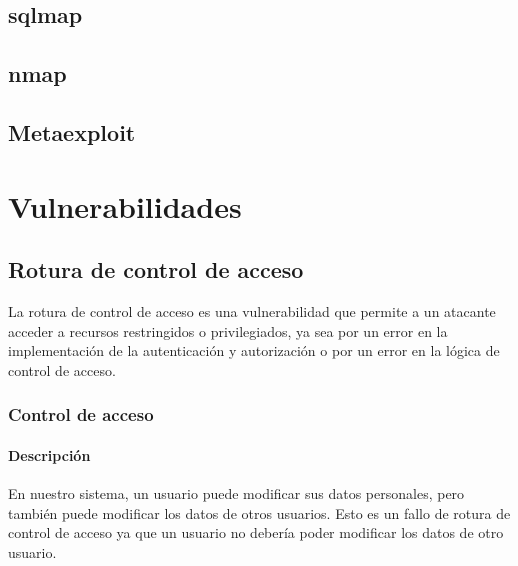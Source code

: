 \documentclass{report}
\begin{document}
        \section{sqlmap}
        \clearpage
        \section{nmap}
        \clearpage
        \section{Metaexploit}
        \clearpage
    \chapter{Vulnerabilidades}
        \section{Rotura de control de acceso}
            La rotura de control de acceso es una vulnerabilidad que permite a un atacante acceder a recursos restringidos o privilegiados, ya sea por un error en la implementación de la autenticación y autorización o por un error en la lógica de control de acceso.
            \subsection{Control de acceso}
                \subsubsection{Descripción}
                    En nuestro sistema, un usuario puede modificar sus datos personales, pero también puede modificar los datos de otros usuarios. 
                    Esto es un fallo de rotura de control de acceso ya que un usuario no debería poder modificar los datos de otro usuario.
\end{document}
